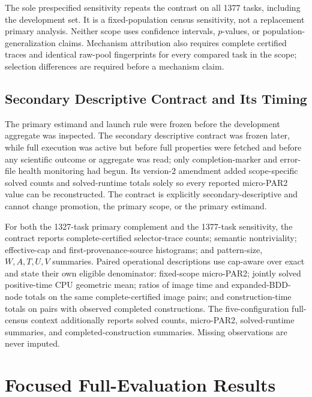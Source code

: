 The sole prespecified sensitivity repeats the contrast on all 1377 tasks,
including the development set.  It is a fixed-population census sensitivity,
not a replacement primary analysis.  Neither scope uses confidence intervals,
\(p\)-values, or population-generalization claims.  Mechanism attribution also
requires complete certified traces and identical raw-pool fingerprints for
every compared task in the scope; selection differences are required before a
mechanism claim.

\subsection{Secondary Descriptive Contract and Its Timing}

The primary estimand and launch rule were frozen before the development
aggregate was inspected.  The secondary descriptive contract was frozen later,
while full execution was active but before full properties were fetched and
before any scientific outcome or aggregate was read; only completion-marker
and error-file health monitoring had begun.  Its version-2 amendment added
scope-specific solved counts and solved-runtime totals solely so every reported
micro-PAR2 value can be reconstructed.  The contract is explicitly
secondary-descriptive and cannot change promotion, the primary scope, or the
primary estimand.

For both the 1327-task primary complement and the 1377-task sensitivity, the
contract reports complete-certified selector-trace counts; semantic
nontriviality; effective-cap and first-provenance-source histograms; and
pattern-size, \(W,A,T,U,V\) summaries.  Paired operational descriptions use
cap-aware over exact and state their own eligible denominator: fixed-scope
micro-PAR2; jointly solved positive-time CPU geometric mean; ratios of image
time and expanded-BDD-node totals on the same complete-certified image pairs;
and construction-time totals on pairs with observed completed constructions.
The five-configuration full-census context additionally reports solved counts,
micro-PAR2, solved-runtime summaries, and completed-construction summaries.
Missing observations are never imputed.

\section{Focused Full-Evaluation Results}

